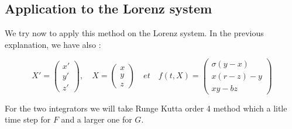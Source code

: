 \subsection{Application to the Lorenz system}

We try now to apply this method on the Lorenz system. In the previous explanation, we have also :

$$X'=\begin{pmatrix}
    x' \\
    y' \\
    z'
\end{pmatrix}, \quad X=\begin{pmatrix}
    x \\
    y \\
    z
\end{pmatrix} \quad et \quad f(t,X)=\begin{pmatrix}
    \sigma(y-x) \\
    x(r-z)-y \\
    xy-bz
\end{pmatrix}$$

\noindent For the two integrators we will take Runge Kutta order 4 method which a litle time step for $F$ and a larger one for $G$.
